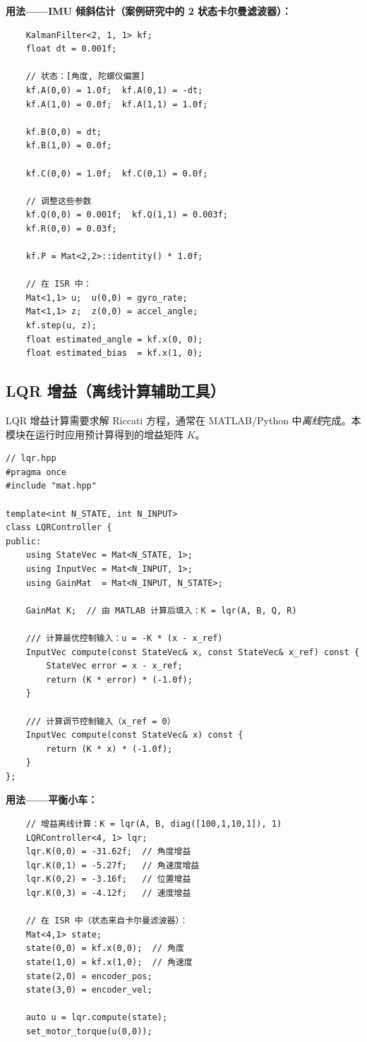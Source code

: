 \textbf{用法——IMU 倾斜估计（案例研究中的 2 状态卡尔曼滤波器）：}
\begin{verbatim}
    KalmanFilter<2, 1, 1> kf;
    float dt = 0.001f;

    // 状态：[角度, 陀螺仪偏置]
    kf.A(0,0) = 1.0f;  kf.A(0,1) = -dt;
    kf.A(1,0) = 0.0f;  kf.A(1,1) = 1.0f;

    kf.B(0,0) = dt;
    kf.B(1,0) = 0.0f;

    kf.C(0,0) = 1.0f;  kf.C(0,1) = 0.0f;

    // 调整这些参数
    kf.Q(0,0) = 0.001f;  kf.Q(1,1) = 0.003f;
    kf.R(0,0) = 0.03f;

    kf.P = Mat<2,2>::identity() * 1.0f;

    // 在 ISR 中：
    Mat<1,1> u;  u(0,0) = gyro_rate;
    Mat<1,1> z;  z(0,0) = accel_angle;
    kf.step(u, z);
    float estimated_angle = kf.x(0, 0);
    float estimated_bias  = kf.x(1, 0);
\end{verbatim}

\subsection{LQR 增益（离线计算辅助工具）}

LQR 增益计算需要求解 Riccati 方程，通常在 MATLAB/Python 中\textit{离线}完成。本模块在运行时应用预计算得到的增益矩阵 $K$。

\begin{verbatim}
// lqr.hpp
#pragma once
#include "mat.hpp"

template<int N_STATE, int N_INPUT>
class LQRController {
public:
    using StateVec = Mat<N_STATE, 1>;
    using InputVec = Mat<N_INPUT, 1>;
    using GainMat  = Mat<N_INPUT, N_STATE>;

    GainMat K;  // 由 MATLAB 计算后填入：K = lqr(A, B, Q, R)

    /// 计算最优控制输入：u = -K * (x - x_ref)
    InputVec compute(const StateVec& x, const StateVec& x_ref) const {
        StateVec error = x - x_ref;
        return (K * error) * (-1.0f);
    }

    /// 计算调节控制输入（x_ref = 0）
    InputVec compute(const StateVec& x) const {
        return (K * x) * (-1.0f);
    }
};
\end{verbatim}

\textbf{用法——平衡小车：}
\begin{verbatim}
    // 增益离线计算：K = lqr(A, B, diag([100,1,10,1]), 1)
    LQRController<4, 1> lqr;
    lqr.K(0,0) = -31.62f;  // 角度增益
    lqr.K(0,1) = -5.27f;   // 角速度增益
    lqr.K(0,2) = -3.16f;   // 位置增益
    lqr.K(0,3) = -4.12f;   // 速度增益

    // 在 ISR 中（状态来自卡尔曼滤波器）：
    Mat<4,1> state;
    state(0,0) = kf.x(0,0);  // 角度
    state(1,0) = kf.x(1,0);  // 角速度
    state(2,0) = encoder_pos;
    state(3,0) = encoder_vel;

    auto u = lqr.compute(state);
    set_motor_torque(u(0,0));
\end{verbatim}


